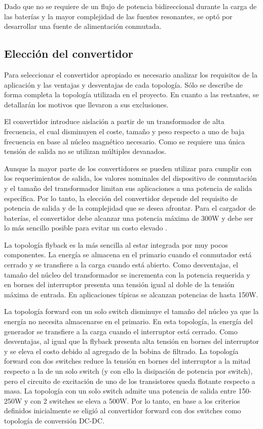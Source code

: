 Dado que no se requiere de un flujo de potencia bidireccional durante la carga de las baterías y la mayor complejidad de las fuentes resonantes, 
se optó por desarrollar una fuente de alimentación conmutada. 

\subsection{Elección del convertidor}

Para seleccionar el convertidor apropiado es necesario analizar los requisitos de la aplicación y las ventajas y desventajas de cada topología.  
Sólo se describe de forma completa la topología utilizada en el proyecto. En cuanto a las restantes, se detallarán los motivos que llevaron a sus exclusiones.  

El convertidor introduce aislación a partir de un transformador de alta frecuencia,
el cual disminuyen el coste, tamaño y peso respecto a uno de baja frecuencia en base al núcleo magnético necesario.
Como se requiere una única tensión de salida no se utilizan múltiples devanados.

Aunque la mayor parte de los convertidores se pueden utilizar para cumplir con los requerimientos de salida, 
los valores nominales del dispositivo de conmutación y el tamaño del transformador limitan sus aplicaciones a una potencia de salida específica. 
Por lo tanto, la elección del convertidor depende del requisito de potencia de salida y de la complejidad que se desea afrontar.
Para el cargador de baterías, el convertidor debe alcanzar una potencia máxima de 300W y debe ser lo más sencillo posible para evitar un costo elevado \cite{hart}.

La topología flyback es la más sencilla al estar integrada por muy pocos componentes. 
La energía se almacena en el primario cuando el conmutador está cerrado y se transfiere a la carga cuando está abierto.
Como desventajas, el tamaño del núcleo del transformador se incrementa con la potencia requerida y en bornes del
interruptor presenta una tensión igual al doble de la tensión máxima de entrada.
En aplicaciones típicas se alcanzan potencias de hasta 150W.

La topología forward con un solo switch disminuye el tamaño del núcleo ya que la energía no necesita almacenarse en el primario.
En esta topología, la energía del generador se transfiere a la carga cuando el interruptor está cerrado.
Como desventajas, al igual que la flyback presenta alta tensión en bornes del interruptor y se eleva el costo debido al agregado de la bobina de filtrado.
La topología forward con dos switches reduce la tensión en bornes del interruptor a la mitad respecto a la de un solo switch (y con ello la disipación de potencia por switch), 
pero el circuito de excitación de uno de los transistores queda flotante respecto a masa. 
La topología con un solo switch admite una potencia de salida entre 150-250W y con 2 switches se eleva a 500W. 
Por lo tanto, en base a los criterios definidos inicialmente se eligió al convertidor forward con dos switches como topología de conversión DC-DC. 

